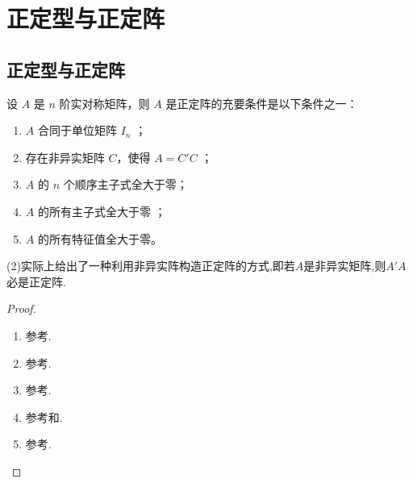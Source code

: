 \documentclass[../../main.tex]{subfiles}
\begin{document}
\section{正定型与正定阵}

\subsection{正定型与正定阵}

\begin{proposition}[正定阵的判定准则]\label{proposition:正定阵的判定准则}
设 $A$ 是 $n$ 阶实对称矩阵，则 $A$ 是正定阵的充要条件是以下条件之一：
\begin{enumerate}[(1)]
\item $A$ 合同于单位矩阵 $I_n$ ；

\item 存在非异实矩阵 $C$，使得 $A = C'C$ ；

\item $A$ 的 $n$ 个顺序主子式全大于零；

\item $A$ 的所有主子式全大于零 ；

\item $A$ 的所有特征值全大于零。
\end{enumerate} 
\end{proposition}
\begin{remark}
(2)实际上给出了一种利用非异实阵构造正定阵的方式,即若$A$是非异实矩阵,则$A'A$必是正定阵.
\end{remark}
\begin{proof}
\begin{enumerate}[(1)]
\item 参考.

\item 参考.

\item 参考.

\item 参考和.

\item 参考.
\end{enumerate}

\end{proof}
\end{document}
